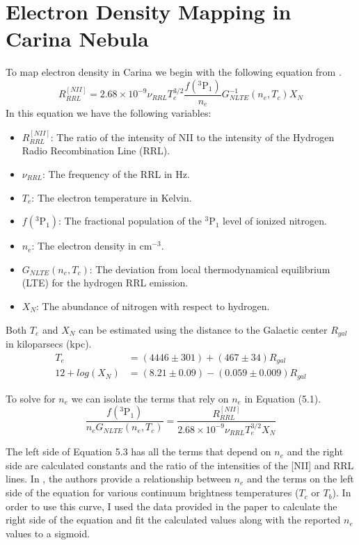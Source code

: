 \chapter[Electron Density Mapping in Carina Nebula]{Electron Density Mapping in Carina Nebula}
\label{ch:carina}

To map electron density in Carina we begin with the following equation from \cite{pineda2018}.
\begin{equation}
    R^{[NII]}_{RRL} = 2.68 \times 10 ^ {-9} \nu_{RRL} T_e^{3/2} \frac{f(^3\text{P}_1)}{n_e} G^{-1}_{NLTE}(n_e,T_c)X_N
    \label{eq:ratio}
\end{equation}
In this equation we have the following variables:
\begin{itemize}
    \item $R^{[NII]}_{RRL}$: The ratio of the intensity of NII to the intensity of the Hydrogen Radio Recombination Line (RRL).
    \item $\nu_{RRL}$: The frequency of the RRL in Hz.
    \item $T_e$: The electron temperature in Kelvin.
    \item $f(^3\text{P}_1)$: The fractional population of the $^3\text{P}_1$ level of ionized nitrogen. 
    \item $n_e$: The electron density in cm$^{-3}$.
    \item $G_{NLTE}(n_e,T_c)$: The deviation from local thermodynamical equilibrium (LTE) for the hydrogen RRL emission.
    \item $X_N$: The abundance of nitrogen with respect to hydrogen.
\end{itemize}

Both $T_e$ and $X_N$ can be estimated using the distance to the Galactic center $R_{gal}$ in kiloparsecs (kpc). 
\begin{align}
    T_e &= (4446 \pm 301) + (467 \pm 34) R_{gal} \\
    12 + log(X_N) &= (8.21 \pm 0.09) - (0.059 \pm 0.009) R_{gal}
\end{align}

To solve for $n_e$ we can isolate the terms that rely on $n_e$ in Equation (5.1).
\begin{equation}
    \frac{f(^3\text{P}_1)}{n_e G_{NLTE}(n_e,T_c)} = \frac{R^{[NII]}_{RRL}}{2.68 \times 10 ^ {-9} \nu_{RRL} T_e^{3/2} X_N}
\end{equation}

The left side of Equation 5.3 has all the terms that depend on $n_e$ and the right side are calculated constants and the ratio of the intensities of the [NII] and RRL lines.
In \cite{pineda2018}, the authors provide a relationship between $n_e$ and the terms on the left side of the equation for various continuum brightness temperatures ($T_c$ or $T_b$).
In order to use this curve, I used the data provided in the paper to calculate the right side of the equation and fit the calculated values along with the reported $n_e$ values to a sigmoid.

